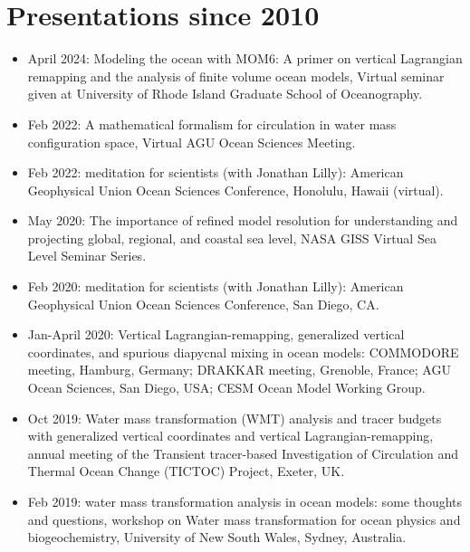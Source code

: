 \section*{\sc \color{Maroon} Presentations since 2010}
\vspace{-.3cm}

\begin{itemize}[leftmargin=*]

\item April 2024: {\sc Modeling the ocean with MOM6: A primer on vertical Lagrangian remapping and the analysis of finite volume ocean models}, Virtual seminar given at University of Rhode Island Graduate School of Oceanography. 

\item Feb 2022: {\sc A mathematical formalism for circulation in water mass configuration space}, Virtual AGU Ocean Sciences Meeting.

\item Feb 2022: {\sc meditation for scientists} (with Jonathan Lilly): {\sc American Geophysical Union Ocean Sciences Conference}, Honolulu, Hawaii (virtual).

\item May 2020: {\sc The importance of refined model resolution for understanding and projecting global, regional, and coastal sea level}, NASA GISS Virtual Sea Level Seminar Series. 

\item Feb 2020: {\sc meditation for scientists} (with Jonathan Lilly): {\sc American Geophysical Union Ocean Sciences Conference}, San Diego, CA. 

\item Jan-April 2020: {\sc Vertical Lagrangian-remapping, generalized vertical coordinates, and spurious diapycnal mixing in ocean
  models}: COMMODORE meeting, Hamburg, Germany; DRAKKAR meeting, Grenoble, France; AGU Ocean Sciences, San Diego, USA; CESM Ocean Model Working Group.  

\item Oct 2019: {\sc Water mass transformation (WMT) analysis
  and tracer budgets with generalized vertical coordinates and vertical Lagrangian-remapping}, annual meeting of the Transient tracer-based Investigation of Circulation and Thermal Ocean Change (TICTOC) Project, Exeter, UK.

\item Feb 2019: {\sc water mass transformation analysis in ocean models: some thoughts and questions}, workshop on Water mass transformation for ocean physics and biogeochemistry, University of New South Wales, Sydney, Australia.  


\end{itemize}
